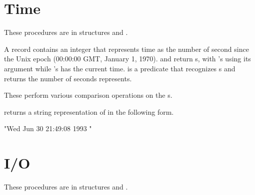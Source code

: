 \section{Time}

These procedures are in structures  and .

\begin{protos}
\end{protos}
\noindent
A  record contains an integer that represents time as
 the number of second since the Unix epoch (00:00:00 GMT, January 1, 1970).
 and  return \/s, with
 's using its argument while 's has
 the current time.
 is a predicate that recognizes \/s and
  returns the number of seconds  represents.

\begin{protos}
\end{protos}
\noindent
These perform various comparison operations on the \/s.

\begin{protos}
\end{protos}
\noindent
{} returns a string representation of  in the
 following form.
\begin{example}
"Wed Jun 30 21:49:08 1993
"
\end{example}

%

\section{I/O}

These procedures are in structures  and .




